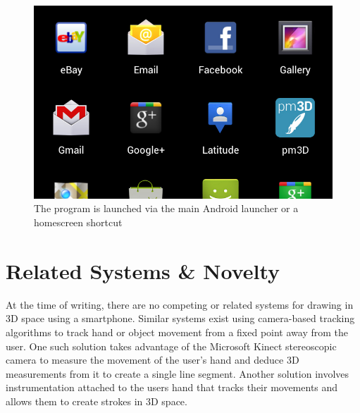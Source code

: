 \documentclass{chi-ext}
\begin{document}
\begin{figure}
\parbox{\columnwidth}{
  \centering
  \includegraphics[width=\columnwidth]{icon.jpg}
  \caption{The program is launched via the main Android launcher or a homescreen shortcut}
  \label{fig:icon}
}
\end{figure}

\section{Related Systems \& Novelty}

At the time of writing, there are no competing or related systems for drawing in 3D space using a smartphone. Similar systems exist using camera-based tracking algorithms to track hand or object movement from a fixed point away from the user. One such solution takes advantage of the Microsoft Kinect stereoscopic camera to measure the movement of the user’s hand and deduce 3D measurements from it to create a single line segment. Another solution involves instrumentation attached to the users hand that tracks their movements and allows them to create strokes in 3D space. 
\end{document}
